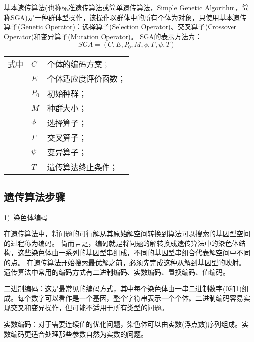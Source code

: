   基本遗传算法(也称标准遗传算法或简单遗传算法，Simple Genetic Algorithm，简称SGA)是一种群体型操作，该操作以群体中的所有个体为对象，只使用基本遗传算子(Genetic Operator)：选择算子(Selection Operator)、交叉算子(Crossover Operator)和变异算子(Mutation Operator)。
  SGA的表示方法为：
  \begin{equation}
    \label{eq:GA}
    SGA = (C, E, P_0, M, \phi, \Gamma, \psi,T)
  \end{equation}
  \begin{flushleft}
    \renewcommand\arraystretch{1.25}
    \begin{tabularx}{\textwidth}{@{}>{\normalsize\rm}l@{\quad}>{\normalsize\rm}l@{——}>{\normalsize\rm}X@{}}
    式中
    
    &  $C$ &个体的编码方案；\\
    &  $E$ &个体适应度评价函数；\\
    &  $P_0$   &初始种群；\\
    &  $M$ & 种群大小；\\
    &  $\phi$ & 选择算子；\\
    &  $\Gamma$ & 交叉算子；\\
    &  $\psi$ & 变异算子；\\
    &  $T$ & 遗传算法终止条件；\\
    \end{tabularx}\vspace{.5ex}%
  \end{flushleft}

    \subsection{遗传算法步骤}
    1)~染色体编码\par
    在遗传算法中，将问题的可行解从其原始解空间转换到算法可以搜索的基因型空间的过程称为编码。
    简而言之，编码就是将问题的解转换成遗传算法中的染色体结构，这些染色体由一系列的基因型串组成，不同的基因型串组合代表解空间中不同的点。
    在遗传算法开始搜索最优解之前，必须先完成这种从解到基因型的映射。遗传算法中常用的编码方式有二进制编码、实数编码、置换编码、值编码。\par
    
    
    二进制编码：这是最常见的编码方式，其中每个染色体由一串二进制数字(0和1)组成。每个数字可以看作是一个基因，整个字符串表示一个个体。二进制编码容易实现交叉和变异操作，但可能不适用于所有类型的问题。

    实数编码：对于需要连续值的优化问题，染色体可以由实数(浮点数)序列组成。实数编码更适合处理那些参数自然为实数的问题。

